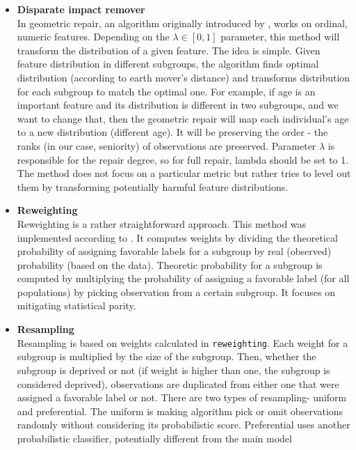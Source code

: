 \begin{itemize}
\tightlist
\item
  \textbf{Disparate impact remover}\\
  In  geometric repair, an algorithm originally
  introduced by \citet{disparateImpact}, works on ordinal, numeric
  features. Depending on the \(\lambda \in [0,1]\) parameter, this
  method will transform the distribution of a given feature. The idea is
  simple. Given feature distribution in different subgroups, the
  algorithm finds optimal distribution (according to earth mover's
  distance) and transforms distribution for each subgroup to match the
  optimal one. For example, if age is an important feature and its
  distribution is different in two subgroups, and we want to change
  that, then the geometric repair will map each individual's age to a
  new distribution (different age). It will be preserving the order -
  the ranks (in our case, seniority) of observations are preserved.
  Parameter \(\lambda\) is responsible for the repair degree, so for
  full repair, lambda should be set to 1. The method does not focus on a
  particular metric but rather tries to level out them by transforming
  potentially harmful feature distributions.
\item
  \textbf{Reweighting}\\
  Reweighting is a rather straightforward approach. This method was
  implemented according to \citet{kamiran}. It computes weights by
  dividing the theoretical probability of assigning favorable labels for
  a subgroup by real (observed) probability (based on the data).
  Theoretic probability for a subgroup is computed by multiplying the
  probability of assigning a favorable label (for all populations) by
  picking observation from a certain subgroup. It focuses on mitigating
  statistical parity.
\item
  \textbf{Resampling}\\
  Resampling is based on weights calculated in \texttt{reweighting}.
  Each weight for a subgroup is multiplied by the size of the subgroup.
  Then, whether the subgroup is deprived or not (if weight is higher
  than one, the subgroup is considered deprived), observations are
  duplicated from either one that were assigned a favorable label or
  not. There are two types of resampling- uniform and preferential. The
  uniform is making algorithm pick or omit observations randomly without
  considering its probabilistic score. Preferential uses another
  probabilistic classifier, potentially different from the main model

\end{itemize}

